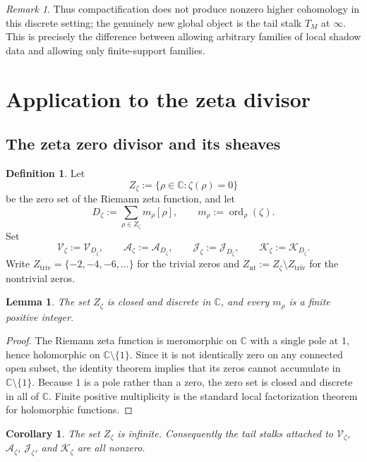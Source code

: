 \documentclass[11pt,a4paper]{article}
\newtheorem{lemma}[theorem]{Lemma}
\newtheorem{corollary}[theorem]{Corollary}
\theoremstyle{definition}
\newtheorem{definition}[theorem]{Definition}
\theoremstyle{remark}
\newtheorem{remark}[theorem]{Remark}
\DeclareMathOperator{\ord}{ord}
\newcommand{\CC}{\mathbb C}
\newcommand{\Vzet}{\mathcal V_{\zeta}}
\newcommand{\Azet}{\mathcal A_{\zeta}}
\newcommand{\Jzet}{\mathcal J_{\zeta}}
\newcommand{\Kzet}{\mathcal K_{\zeta}}
\begin{document}
\begin{remark}
Thus compactification does not produce nonzero higher cohomology in this discrete setting; the genuinely new global object is the tail stalk $T_M$ at $\infty$.  This is precisely the difference between allowing arbitrary families of local shadow data and allowing only finite-support families.
\end{remark}

\section{Application to the zeta divisor}

\subsection{The zeta zero divisor and its sheaves}

\begin{definition}
Let
\[
Z_\zeta:=\{\rho\in\CC:\zeta(\rho)=0\}
\]
be the zero set of the Riemann zeta function, and let
\[
D_\zeta:=\sum_{\rho\in Z_\zeta}m_\rho[\rho],
\qquad
m_\rho:=\ord_\rho(\zeta).
\]
Set
\[
\Vzet:=\mathcal V_{D_\zeta},
\qquad
\Azet:=\mathcal A_{D_\zeta},
\qquad
\Jzet:=\mathcal J_{D_\zeta},
\qquad
\Kzet:=\mathcal K_{D_\zeta}.
\]
Write $Z_{\mathrm{triv}}=\{-2,-4,-6,\dots\}$ for the trivial zeros and $Z_{\mathrm{nt}}:=Z_\zeta\setminus Z_{\mathrm{triv}}$ for the nontrivial zeros.
\end{definition}

\begin{lemma}\label{lem:zeta-zeros-discrete}
The set $Z_\zeta$ is closed and discrete in $\CC$, and every $m_\rho$ is a finite positive integer.
\end{lemma}

\begin{proof}
The Riemann zeta function is meromorphic on $\CC$ with a single pole at $1$, hence holomorphic on $\CC\setminus\{1\}$.  Since it is not identically zero on any connected open subset, the identity theorem implies that its zeros cannot accumulate in $\CC\setminus\{1\}$.  Because $1$ is a pole rather than a zero, the zero set is closed and discrete in all of $\CC$.  Finite positive multiplicity is the standard local factorization theorem for holomorphic functions.
\end{proof}

\begin{corollary}\label{cor:trivial-infinite}
The set $Z_\zeta$ is infinite.  Consequently the tail stalks attached to $\Vzet$, $\Azet$, $\Jzet$, and $\Kzet$ are all nonzero.
\end{corollary}
\end{document}
